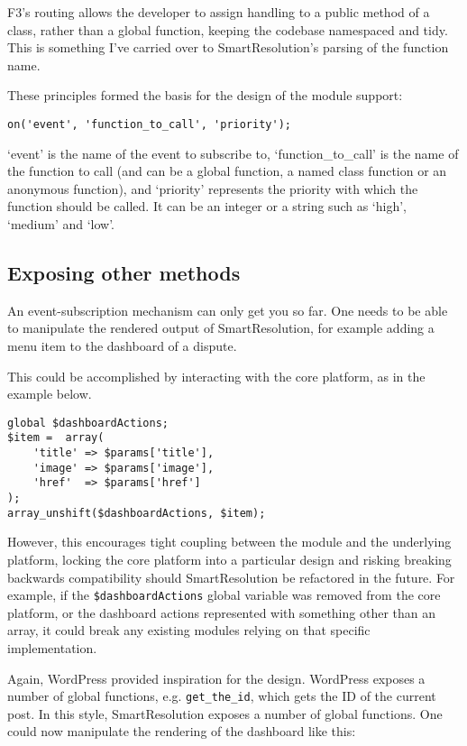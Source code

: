 F3's routing allows the developer to assign handling to a public method of a class, rather than a global function, keeping the codebase namespaced and tidy. This is something I've carried over to SmartResolution's parsing of the function name.

These principles formed the basis for the design of the module support:

\begin{lstlisting}
on('event', 'function_to_call', 'priority');
\end{lstlisting}

`event' is the name of the event to subscribe to, `function\_to\_call' is the name of the function to call (and can be a global function, a named class function or an anonymous function), and `priority' represents the priority with which the function should be called. It can be an integer or a string such as `high', `medium' and `low'.

\subsection{Exposing other methods}

An event-subscription mechanism can only get you so far. One needs to be able to manipulate the rendered output of SmartResolution, for example adding a menu item to the dashboard of a dispute.

This could be accomplished by interacting with the core platform, as in the example below.

\begin{lstlisting}
global $dashboardActions;
$item =  array(
    'title' => $params['title'],
    'image' => $params['image'],
    'href'  => $params['href']
);
array_unshift($dashboardActions, $item);
\end{lstlisting}

However, this encourages tight coupling between the module and the underlying platform, locking the core platform into a particular design and risking breaking backwards compatibility should SmartResolution be refactored in the future. For example, if the \lstinline{$dashboardActions} global variable was removed from the core platform, or the dashboard actions represented with something other than an array, it could break any existing modules relying on that specific implementation.

Again, WordPress provided inspiration for the design. WordPress exposes a number of global functions, e.g. \lstinline{get_the_id}, which gets the ID of the current post. In this style, SmartResolution exposes a number of global functions. One could now manipulate the rendering of the dashboard like this:

